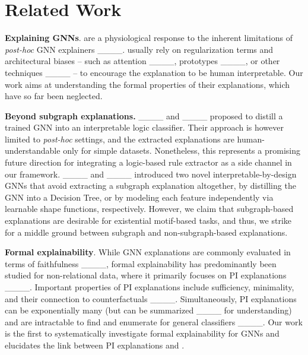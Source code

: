 \section{Related Work}
\label{sec:related-work}

\textbf{Explaining GNNs}. \SEGNNs are a physiological response to the inherent limitations of \textit{post-hoc} GNN explainers ____.
%
\SEGNNs usually rely on regularization terms and architectural biases -- such as attention ____, prototypes ____, or other techniques ____ -- to encourage the explanation to be human interpretable. 
%
Our work aims at understanding the formal properties of their explanations, which have so far been neglected.


\textbf{Beyond subgraph explanations.} 
%
%
____ and ____ proposed to distill a trained GNN into an interpretable logic classifier.   Their approach is however limited to \textit{post-hoc} settings, and the extracted explanations are human-understandable only for simple datasets.
%
Nonetheless, this represents a promising future direction for integrating a logic-based rule extractor as a side channel in our \GLSSEGNNs framework.
%
____ and ____ introduced two novel interpretable-by-design GNNs that avoid extracting a subgraph explanation altogether, by distilling the GNN into a Decision Tree, or by modeling each feature independently via learnable shape functions, respectively.
%
However, we claim that subgraph-based explanations are desirable for existential motif-based tasks, and thus, we %
strike for a middle ground between subgraph and non-subgraph-based explanations.


\textbf{Formal explainability}.  While GNN explanations are commonly evaluated in terms of faithfulness ____, formal explainability has predominantly been studied for non-relational data, where it primarily focuses on PI explanations ____.
%
Important properties of PI explanations include sufficiency, minimality, and their connection to counterfactuals ____.  Simultaneously, PI explanations can be exponentially many (but can be summarized ____ for understanding) and are intractable to find and enumerate for general classifiers ____.
%
Our work is the first to systematically investigate formal explainability for GNNs and elucidates the link between PI explanations and \SEGNNs.


